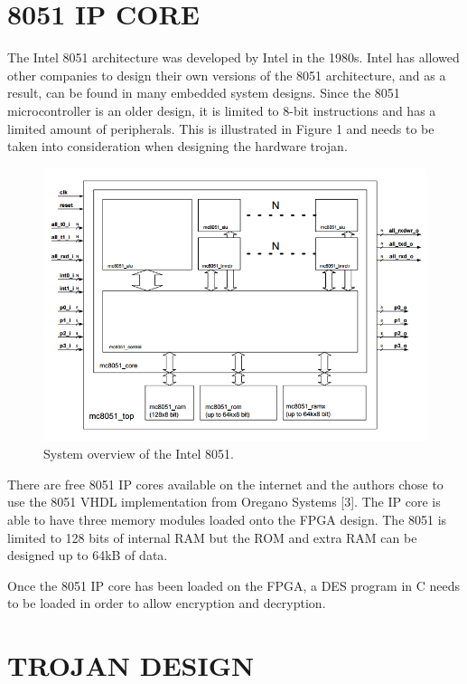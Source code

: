 \documentclass[letterpaper, 10 pt, conference]{ieeeconf}  %
\begin{document}

\section{8051 IP CORE}

The Intel 8051 architecture was developed by Intel in the 1980s.  Intel has allowed other companies to design their own versions of the 8051 architecture, and as a result, can be found in many embedded system designs.  Since the 8051 microcontroller is an older design, it is limited to 8-bit instructions and has a limited amount of peripherals.  This is illustrated in Figure 1 and needs to be taken into consideration when designing the hardware trojan.  

\begin{figure}[thpb]
	\centering
	\includegraphics[scale=.50]{8051}
   \caption{System overview of the Intel 8051.}
\end{figure}

There are free 8051 IP cores available on the internet and the authors chose to use the 8051 VHDL implementation from Oregano Systems [3].  The IP core is able to have three memory modules loaded onto the FPGA design.  The 8051 is limited to 128 bits of internal RAM but the ROM and extra RAM can be designed up to 64kB of data.

Once the 8051 IP core has been loaded on the FPGA, a DES program in C needs to be loaded in order to allow encryption and decryption.

\section{TROJAN DESIGN}
\end{document}
